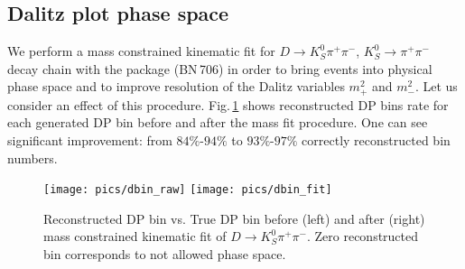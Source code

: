\documentclass[preprint,aps,showpacs]{revtex4}
\newcommand{\massp}{\ensuremath{m^2_{+}}\xspace}
\newcommand{\massm}{\ensuremath{m^2_{-}}\xspace}
\newcommand{\dkpp}{\ensuremath{D\to K^0_S\pi^+\pi^-}\xspace}
\newcommand{\bdpi}{\ensuremath{B^0\to \bar D^0\pi^0}\xspace}
\newcommand{\de}{\ensuremath{\Delta E}\xspace}
\newcommand{\mbc}{\ensuremath{M_{bc}}\xspace}
\begin{document}
 

\clearpage
\subsection{Dalitz plot phase space}\label{sec:DP_phsp}
We perform a mass constrained kinematic fit for \dkpp, $K_S^0\to\pi^+\pi^-$ decay chain with the \verb@ExKFitter@ package (BN\,706) in order to bring events into physical phase space and to improve resolution of the Dalitz variables \massp and \massm. Let us consider an effect of this procedure. Fig.\,\ref{fig:DalitzBins} shows reconstructed DP bins rate for each generated DP bin before and after the mass fit procedure. One can see significant improvement: from $84\%$-$94\%$ to $93\%$-$97\%$ correctly reconstructed bin numbers.
\begin{figure}[htb]
 \texttt{[image: pics/dbin\_raw]}
 \texttt{[image: pics/dbin\_fit]}
 \caption{Reconstructed DP bin vs. True DP bin before (left) and after (right) mass constrained kinematic fit of \dkpp. Zero reconstructed bin corresponds to not allowed phase space.}
\label{fig:DalitzBins}
\end{figure}
\end{document}
